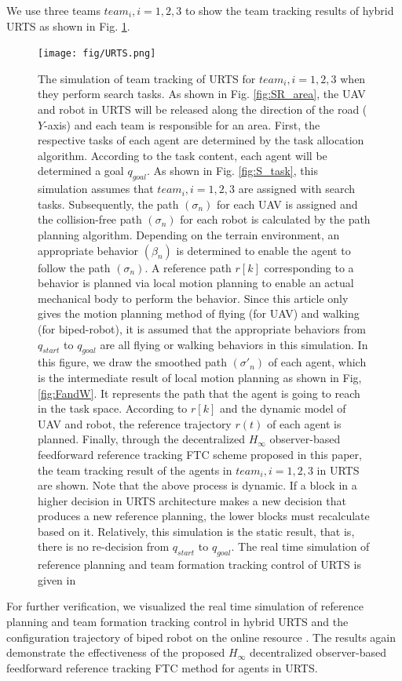 \documentclass{ieeeaccess}
\begin{document}
We use three teams $team_i, i=1, 2, 3$ to show the team tracking results of hybrid URTS as shown in Fig. \ref{fig:URTS}.
\begin{figure}[htbp]
    \centering
    \texttt{[image: fig/URTS.png]}\caption{The simulation of team tracking of URTS for $team_i,i=1,2,3$ when they perform search tasks. As shown in Fig. \ref{fig:SR_area}, the UAV and robot in URTS will be released along the direction of the road ($Y$-axis) and each team is responsible for an area. First, the respective tasks of each agent are determined by the task allocation algorithm. According to the task content, each agent will be determined a goal $q_{goal}$. As shown in Fig. \ref{fig:S_task}, this simulation assumes that $team_i,i=1,2,3$ are assigned with search tasks. Subsequently, the path $(\sigma_n)$ for each UAV is assigned and the collision-free path $(\sigma_n)$ for each robot is calculated by the path planning algorithm. Depending on the terrain environment, an appropriate behavior $(\beta_n)$ is determined to enable the agent to follow the path $(\sigma_n)$. A reference path $r[k]$ corresponding to a behavior is planned via local motion planning to enable an actual mechanical body to perform the behavior. Since this article only gives the motion planning method of flying (for UAV) and walking (for biped-robot), it is assumed that the appropriate behaviors from $q_{start}$ to $q_{goal}$ are all flying or walking behaviors in this simulation. In this figure, we draw the smoothed path $(\sigma'_n)$ of each agent, which is the intermediate result of local motion planning as shown in Fig, \ref{fig:FandW}. It represents the path that the agent is going to reach in the task space. According to $r[k]$ and the dynamic model of UAV and robot, the reference trajectory $r(t)$ of each agent is planned. Finally, through the decentralized $H_\infty$ observer-based feedforward reference tracking FTC scheme proposed in this paper, the team tracking result of the agents in $team_i, i=1,2,3$ in URTS are shown. Note that the above process is dynamic. If a block in a higher decision in URTS architecture makes a new decision that produces a new reference planning, the lower blocks must recalculate based on it. Relatively, this simulation is the static result, that is, there is no re-decision from $q_{start}$ to $q_{goal}$. The real time simulation of reference planning and team formation tracking control of URTS is given in \cite{mySimulation}}
    \label{fig:URTS}
\end{figure}

For further verification, we visualized the real time simulation of reference planning and team formation tracking control in hybrid URTS and the configuration trajectory of biped robot on the online resource \cite{mySimulation}. The results again demonstrate the effectiveness of the proposed $H_\infty$ decentralized observer-based feedforward reference tracking FTC method for agents in URTS.
\end{document}
